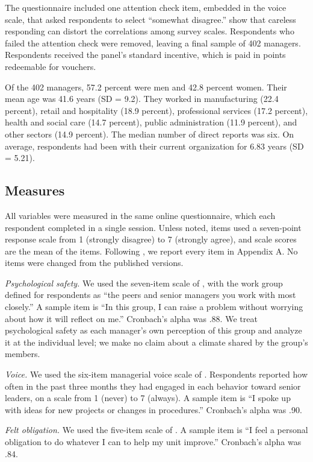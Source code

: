 \documentclass[12pt]{article}
\begin{document}
The questionnaire included one attention check item, embedded in the voice scale, that asked respondents to select ``somewhat disagree.'' \citet{meade2012} show that careless responding can distort the correlations among survey scales. Respondents who failed the attention check were removed, leaving a final sample of 402 managers. Respondents received the panel's standard incentive, which is paid in points redeemable for vouchers.

Of the 402 managers, 57.2 percent were men and 42.8 percent women. Their mean age was 41.6 years (SD = 9.2). They worked in manufacturing (22.4 percent), retail and hospitality (18.9 percent), professional services (17.2 percent), health and social care (14.7 percent), public administration (11.9 percent), and other sectors (14.9 percent). The median number of direct reports was six. On average, respondents had been with their current organization for 6.83 years (SD = 5.21).

\subsection{Measures}

All variables were measured in the same online questionnaire, which each respondent completed in a single session. Unless noted, items used a seven-point response scale from 1 (strongly disagree) to 7 (strongly agree), and scale scores are the mean of the items. Following \citet{flake2020}, we report every item in Appendix A. No items were changed from the published versions.

\textit{Psychological safety.} We used the seven-item scale of \citet{dravenko2015}, with the work group defined for respondents as ``the peers and senior managers you work with most closely.'' A sample item is ``In this group, I can raise a problem without worrying about how it will reflect on me.'' Cronbach's alpha was .88. We treat psychological safety as each manager's own perception of this group and analyze it at the individual level; we make no claim about a climate shared by the group's members.

\textit{Voice.} We used the six-item managerial voice scale of \citet{pell2018}. Respondents reported how often in the past three months they had engaged in each behavior toward senior leaders, on a scale from 1 (never) to 7 (always). A sample item is ``I spoke up with ideas for new projects or changes in procedures.'' Cronbach's alpha was .90.

\textit{Felt obligation.} We used the five-item scale of \citet{quennell2016}. A sample item is ``I feel a personal obligation to do whatever I can to help my unit improve.'' Cronbach's alpha was .84.
\end{document}
